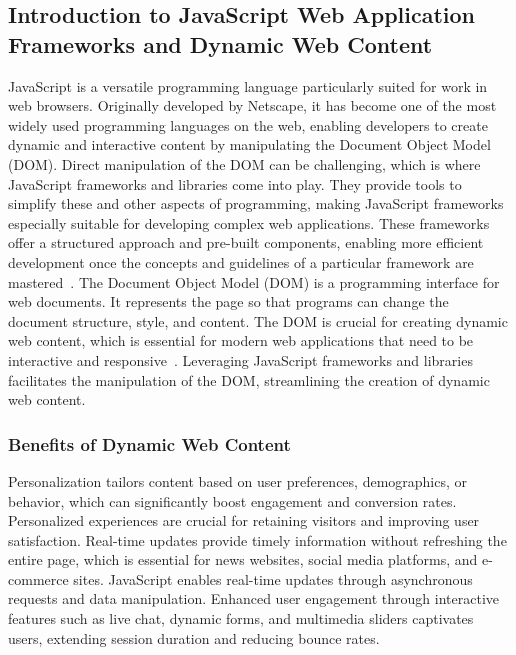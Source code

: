 \documentclass[conference]{IEEEtran}
\begin{document}
\subsection{Introduction to JavaScript Web Application Frameworks and Dynamic Web Content}

JavaScript is a versatile programming language particularly suited for work in web browsers. Originally developed by Netscape, it has become one of the most widely used programming languages on the web, enabling developers to create dynamic and interactive content by manipulating the Document Object Model (DOM). Direct manipulation of the DOM can be challenging, which is where JavaScript frameworks and libraries come into play. They provide tools to simplify these and other aspects of programming, making JavaScript frameworks especially suitable for developing complex web applications. These frameworks offer a structured approach and pre-built components, enabling more efficient development once the concepts and guidelines of a particular framework are mastered~\cite{ionos_jsframeworks}.
\newline
The Document Object Model (DOM) is a programming interface for web documents. It represents the page so that programs can change the document structure, style, and content. The DOM is crucial for creating dynamic web content, which is essential for modern web applications that need to be interactive and responsive~\cite{mdn_dom}. Leveraging JavaScript frameworks and libraries facilitates the manipulation of the DOM, streamlining the creation of dynamic web content.
\newline
\subsubsection{Benefits of Dynamic Web Content}

Personalization tailors content based on user preferences, demographics, or behavior, which can significantly boost engagement and conversion rates. Personalized experiences are crucial for retaining visitors and improving user satisfaction. Real-time updates provide timely information without refreshing the entire page, which is essential for news websites, social media platforms, and e-commerce sites. JavaScript enables real-time updates through asynchronous requests and data manipulation. Enhanced user engagement through interactive features such as live chat, dynamic forms, and multimedia sliders captivates users, extending session duration and reducing bounce rates.
\newline
\end{document}
